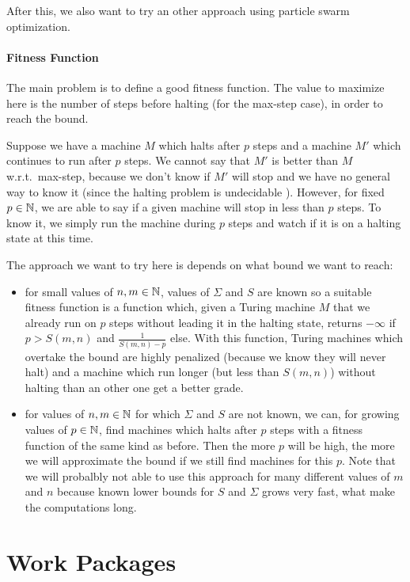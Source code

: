 \documentclass{article}
\begin{document}
After this, we also want to try an other approach using particle swarm optimization.

\paragraph{Fitness Function}
The main problem is to define a good fitness function. The value to maximize here is the number of steps before halting (for the max-step case), in order to reach the bound.

Suppose we have a machine $M$ which halts after $p$ steps and a machine $M'$ which continues to run after $p$ steps.
We cannot say that $M'$ is better than $M$ w.r.t.\ max-step, because we don't know if $M'$ will stop and we have no general way to know it (since the halting problem is undecidable \cite{turing}).
However, for fixed $p \in \mathbb{N}$, we are able to say if a given machine will stop in less than $p$ steps. To know it, we simply run the machine during $p$ steps and watch if it is on a halting state at this time.

The approach we want to try here is depends on what bound we want to reach:
\begin{itemize}
\item for small values of $n,m \in \mathbb{N}$, values of $\Sigma$ and $S$ are known \cite{rado} so a suitable fitness function is a function which, given a Turing machine $M$ that we already run on $p$ steps without leading it in the halting state, returns $- \infty$ if $p > S(m,n)$ and $\frac{1}{S(m,n) - p}$ else. With this function, Turing machines which overtake the bound are highly penalized (because we know they will never halt) and a machine which run longer (but less than $S(m,n)$) without halting than an other one get a better grade.

\item for values of $n, m \in \mathbb{N}$ for which $\Sigma$ and $S$ are not known, we can, for growing values of $p \in \mathbb{N}$, find machines which halts after $p$ steps with a fitness function of the same kind as before. Then the more $p$ will be high, the more we will approximate the bound if we still find machines for this $p$. Note that we will probalbly not able to use this approach for many different values of $m$ and $n$ because known lower bounds for $S$ and $\Sigma$ grows very fast, what make the computations long.
\end{itemize}

\section{Work  Packages}
\end{document}
